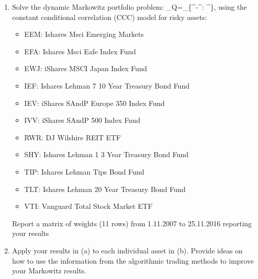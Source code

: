 \documentclass[a4paper,9pt]{article}
\begin{document}
\begin{enumerate}
\begin{enumerate}
	\item  Solve the dynamic Markowitz portfolio problem:
	\beqn
	\omegavec_{\mbox{\small Q}}=\argmax_\omegavec\left\{\hat\muvec^\top\omegavec-\omegavec^\top\hat\mSigma\omegavec: \onevec^\top{}\right\},
	\eeqn
	using the constant conditional correlation (CCC) model for  risky assets:
	\begin{itemize}
	\item EEM: Ishares Msci Emerging Markets
	\item EFA: Ishares Msci Eafe Index Fund
	\item EWJ: iShares MSCI Japan Index Fund
	\item IEF: Ishares Lehman 7 10 Year Treasury Bond Fund
	\item IEV: iShares SAndP Europe 350 Index Fund
	\item IVV: iShares SAndP 500 Index Fund
	\item RWR: DJ Wilshire REIT ETF
	\item SHY: Ishares Lehman 1 3 Year Treasury Bond Fund
	\item TIP: Ishares Lehman Tips Bond Fund
	\item TLT: Ishares Lehman 20 Year Treasury Bond Fund
	\item VTI: Vanguard Total Stock Market ETF
	\end{itemize}
	Report a matrix of weights (11 rows) from 1.11.2007 to 25.11.2016 reporting your results 
	 \item Apply your results in (a) to each individual asset in (b).  Provide ideas on how to use the information from the algorithmic trading methods to improve your Markowitz results.
	\end{enumerate}
\end{enumerate}
\end{document}
